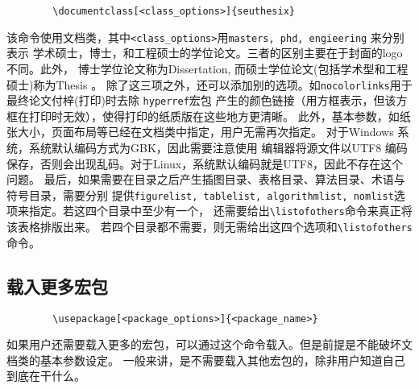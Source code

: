 \documentclass[figurelist,tablelist,algorithmlist,nomlist,masters]{seuthesix}
\begin{document}
	{\color{magenta}
		\begin{verbatim}
		\documentclass[<class_options>]{seuthesix}
		\end{verbatim}
	}
	该命令使用\seuthesix 文档类，其中\verb+<class_options>+用\texttt{masters, phd, engieering} 来分别表示
	学术硕士，博士，和工程硕士的学位论文。三者的区别主要在于封面的logo 不同。此外，
	博士学位论文称为Dissertation, 而硕士学位论文(包括学术型和工程硕士)称为Thesis 。
	除了这三项之外，还可以添加别的选项。如{\texttt{nocolorlinks}}用于最终论文付梓(打印)时去除
	\texttt{hyperref}宏包
	产生的颜色链接（用方框表示，但该方框在打印时无效），使得打印的纸质版在这些地方更清晰。
	此外，基本参数，如纸张大小，页面布局等已经在文档类中指定，用户无需再次指定。
	对于Windows 系统，系统默认编码方式为GBK，因此需要注意使用
	编辑器将源文件以UTF8 编码保存，否则会出现乱码。对于Linux，系统默认编码就是UTF8，因此不存在这个问题。
	最后，如果需要在目录之后产生插图目录、表格目录、算法目录、术语与符号目录，需要分别
	提供\texttt{figurelist, tablelist, algorithmlist, nomlist}选项来指定。若这四个目录中至少有一个，
	还需要给出\verb+\listofothers+命令来真正将该表格排版出来。
	若四个目录都不需要，则无需给出这四个选项和\verb+\listofothers+命令。
	\subsection{载入更多宏包}
	{\color{magenta}
		\begin{verbatim}
		\usepackage[<package_options>]{<package_name>}
		\end{verbatim}
	}
	如果用户还需要载入更多的宏包，可以通过这个命令载入。但是前提是不能破坏\seuthesix 文档类的基本参数设定。
	一般来讲，是不需要载入其他宏包的，除非用户知道自己到底在干什么。
	
\end{document}

